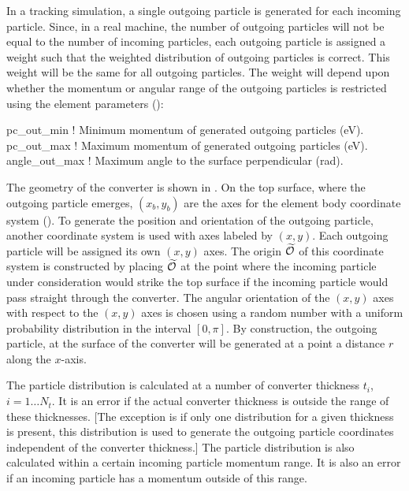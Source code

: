 In a tracking simulation, a single outgoing particle is generated for each incoming particle. Since,
in a real machine, the number of outgoing particles will not be equal to the number of incoming
particles, each outgoing particle is assigned a weight such that the weighted distribution of
outgoing particles is correct. This weight will be the same for all outgoing particles. The weight
will depend upon whether the momentum or angular range of the outgoing particles is restricted using
the element parameters ():
\begin{example}
  pc_out_min    ! Minimum momentum of generated outgoing particles (eV).
  pc_out_max    ! Maximum momentum of generated outgoing particles (eV).
  angle_out_max ! Maximum angle to the surface perpendicular (rad).
\end{example}

The geometry of the converter is shown in . On the top surface, where the outgoing
particle emerges, $(x_b,y_b)$ are the axes for the element body coordinate system ().
To generate the position and orientation of the outgoing particle, another coordinate system is used
with axes labeled by $(x,y)$. Each outgoing particle will be assigned its own $(x,y)$
axes. The origin $\widetilde{{\cal O}}$ of this coordinate system is constructed by placing $\widetilde{{\cal O}}$ at the
point where the incoming particle under consideration would strike the top surface if the incoming
particle would pass straight through the converter. The angular orientation of the $(x,y)$ axes
with respect to the $(x,y)$ axes is chosen using a random number with a uniform probability
distribution in the interval $[0, \pi]$. By construction, the outgoing particle, at the surface of
the converter will be generated at a point a distance $r$ along the $x$-axis.

The particle distribution is calculated at a number of converter thickness $t_i$, $i = 1 \ldots
N_t$. It is an error if the actual converter thickness is outside the range of these
thicknesses. [The exception is if only one distribution for a given thickness is present, this
distribution is used to generate the outgoing particle coordinates independent of the converter
thickness.]  The particle distribution is also calculated within a certain incoming particle
momentum range. It is also an error if an incoming particle has a momentum outside of this range.

